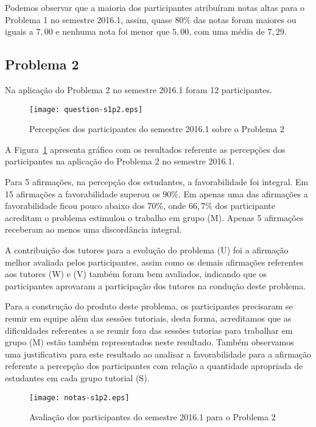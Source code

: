 Podemos observar que a maioria dos participantes atribuíram
notas altas para o Problema 1 no semestre 2016.1, assim, quase $80\%$ das notas
foram maiores ou iguais a $7,00$ e nenhuma nota foi menor que $5,00$, com uma média
de $7,29$.
  
\subsection{Problema 2}
Na aplicação do Problema 2 no semestre 2016.1 foram 12 participantes.

\begin{figure}[!htb]
\centering
\texttt{[image: question-s1p2.eps]}
\caption{Percepções dos participantes do semestre 2016.1 sobre o Problema 2}
\label{percep-s1p2}
\end{figure}

A Figura~\ref{percep-s1p2} apresenta gráfico com os resultados referente
as percepções dos participantes na aplicação do
Problema 2 no semestre 2016.1.

Para 5 afirmações, na percepção dos estudantes, a favorabilidade foi integral.
Em 15 afirmações a favorabilidade superou os $90\%$.
Em apenas uma das afirmações a favorabilidade ficou pouco abaixo dos $70\%$, onde
$66,7\%$ dos participante acreditam o problema estimulou
o trabalho em grupo (M).
Apenas 5 afirmações receberam ao menos uma discordância integral.

A contribuição dos tutores para a evolução do problema (U) foi a
afirmação melhor avaliada pelos participantes, assim como os demais
afirmações referentes aos tutores (W) e (V) também foram bem avaliados,
indicando que os participantes aprovaram a participação
dos tutores na condução deste problema.

Para a construção do produto deste problema, os participantes
precisaram se reunir em equipe além das sessões tutoriais, desta forma,
acreditamos que as dificuldades referentes a se reunir fora das sessões tutorias
para trabalhar em grupo (M) estão também representados neste resultado.
Também observamos uma justificativa para este resultado ao analisar a favorabilidade para
a afirmação referente a percepção dos participantes com relação a quantidade
apropriada de estudantes em cada grupo tutorial (S).

\begin{figure}[!htb]
\centering
\texttt{[image: notas-s1p2.eps]}
\caption{Avaliação dos participantes do semestre 2016.1 para o Problema 2}
\label{aval-s1p2}
\end{figure}

